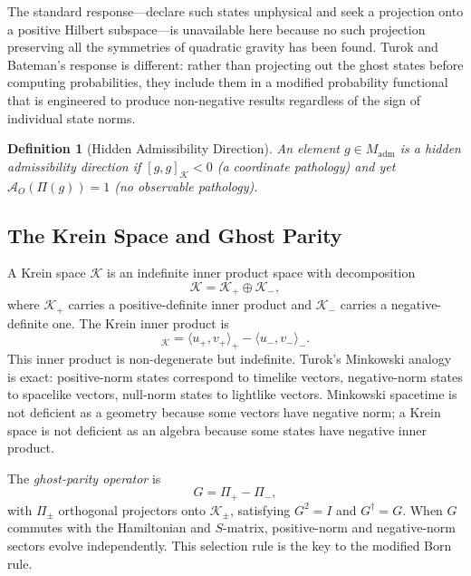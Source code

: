 \documentclass[12pt,a4paper]{article}
\newtheorem{definition}[theorem]{Definition}
\theoremstyle{remark}
\begin{document}
The standard response---declare such states unphysical and seek a projection
onto a positive Hilbert subspace---is unavailable here because no such
projection preserving all the symmetries of quadratic gravity has been found.
Turok and Bateman's response is different: rather than projecting out the
ghost states before computing probabilities, they include them in a modified
probability functional that is engineered to produce non-negative results
regardless of the sign of individual state norms.

\begin{definition}[Hidden Admissibility Direction]
An element $g \in M_{\mathrm{adm}}$ is a \emph{hidden admissibility
direction} if $[g, g]_{\mathcal{K}} < 0$ (a coordinate pathology) and
yet $\mathcal{A}_O(\Pi(g)) = 1$ (no observable pathology).
\end{definition}

\subsection{The Krein Space and Ghost Parity}

A Krein space $\mathcal{K}$ is an indefinite inner product space with
decomposition
\begin{equation}
  \mathcal{K} = \mathcal{K}_+ \oplus \mathcal{K}_-,
\end{equation}
where $\mathcal{K}_+$ carries a positive-definite inner product and
$\mathcal{K}_-$ carries a negative-definite one. The Krein inner product is
\begin{equation}
  [u, v]_{\mathcal{K}} = \langle u_+, v_+\rangle_+ - \langle u_-, v_-\rangle_-.
\end{equation}
This inner product is non-degenerate but indefinite. Turok's Minkowski
analogy is exact: positive-norm states correspond to timelike vectors,
negative-norm states to spacelike vectors, null-norm states to lightlike
vectors. Minkowski spacetime is not deficient as a geometry because
some vectors have negative norm; a Krein space is not deficient as an
algebra because some states have negative inner product.

The \emph{ghost-parity operator} is
\begin{equation}
  G = \Pi_+ - \Pi_-,
\end{equation}
with $\Pi_\pm$ orthogonal projectors onto $\mathcal{K}_\pm$, satisfying
$G^2 = I$ and $G^\dagger = G$. When $G$ commutes with the Hamiltonian
and $S$-matrix, positive-norm and negative-norm sectors evolve independently.
This selection rule is the key to the modified Born rule.
\end{document}
